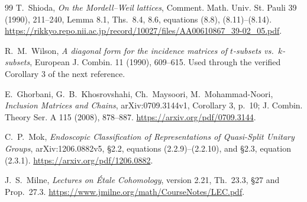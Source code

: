 \begin{thebibliography}{99}
T.~Shioda, \emph{On the Mordell--Weil lattices}, Comment. Math. Univ.
St. Pauli 39 (1990), 211--240, Lemma 8.1, Ths.~8.4, 8.6,
equations (8.8), (8.11)--(8.14).
\url{https://rikkyo.repo.nii.ac.jp/record/10027/files/AA00610867_39-02_05.pdf}.

R.~M.~Wilson, \emph{A diagonal form for the incidence matrices of
$t$-subsets vs.\ $k$-subsets}, European J. Combin. 11 (1990),
609--615. Used through the verified Corollary 3 of the next reference.

E.~Ghorbani, G.~B.~Khosrovshahi, Ch.~Maysoori, M.~Mohammad-Noori,
\emph{Inclusion Matrices and Chains}, arXiv:0709.3144v1,
Corollary 3, p.~10; J. Combin. Theory Ser. A 115 (2008), 878--887.
\url{https://arxiv.org/pdf/0709.3144}.

C.~P.~Mok, \emph{Endoscopic Classification of Representations of
Quasi-Split Unitary Groups}, arXiv:1206.0882v5,
\S2.2, equations (2.2.9)--(2.2.10), and \S2.3, equation (2.3.1).
\url{https://arxiv.org/pdf/1206.0882}.

J.~S.~Milne, \emph{Lectures on \'Etale Cohomology}, version 2.21,
Th.~23.3, \S27 and Prop.~27.3.
\url{https://www.jmilne.org/math/CourseNotes/LEC.pdf}.
\end{thebibliography}

